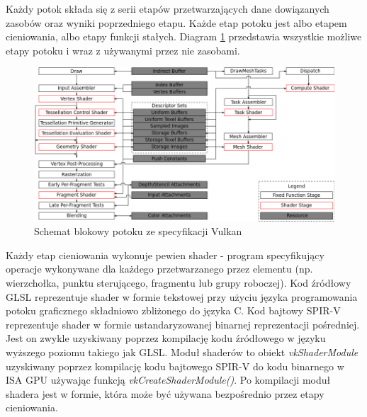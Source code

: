 Każdy potok składa się z serii etapów przetwarzających dane dowiązanych zasobów oraz wyniki poprzedniego etapu.
Każde etap potoku jest albo etapem cieniowania, albo etapy funkcji stałych. Diagram \ref{vulkan_pipelines} przedstawia wszystkie możliwe etapy potoku i wraz z używanymi przez nie zasobami.
\begin{figure}[htbp]
	\centering
	\includegraphics[width=1.0\textwidth]{images/vulkan_spec_pipeline.png}
	\caption{Schemat blokowy potoku ze specyfikacji Vulkan \cite{VULKANSPEC}}
	\label{vulkan_pipelines}
\end{figure}

Każdy etap cieniowania wykonuje pewien shader - program specyfikujący operacje wykonywane dla każdego przetwarzanego przez elementu (np. wierzchołka, punktu sterującego, fragmentu lub grupy roboczej).
Kod źródłowy GLSL reprezentuje shader w formie tekstowej przy użyciu języka programowania potoku graficznego składniowo zbliżonego do języka C.
Kod bajtowy SPIR-V reprezentuje shader w formie ustandaryzowanej binarnej reprezentacji pośredniej. Jest on zwykle uzyskiwany poprzez kompilację kodu źródłowego w języku wyższego poziomu takiego jak GLSL.
Moduł shaderów to obiekt \textit{vkShaderModule} uzyskiwany poprzez kompilację kodu bajtowego SPIR-V do kodu binarnego w ISA GPU używając funkcją \textit{vkCreateShaderModule()}.
Po kompilacji moduł shadera jest w formie, która może być używana bezpośrednio przez etapy cieniowania.

